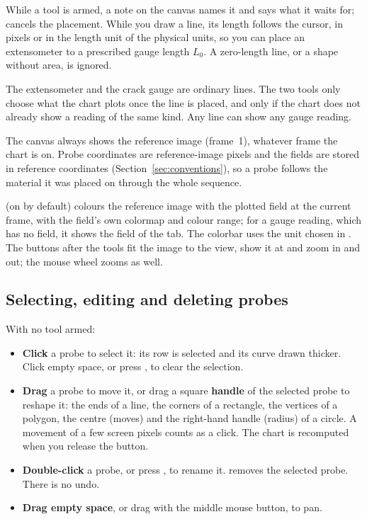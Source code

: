 While a tool is armed, a note on the canvas names it and says what it waits for;  cancels
the placement. While you draw a line, its length follows the cursor, in pixels or in the length
unit of the physical units, so you can place an extensometer to a prescribed gauge length $L_0$. A
zero-length line, or a shape without area, is ignored.

The extensometer and the crack gauge are ordinary lines. The two tools only choose what the chart
plots once the line is placed, and only if the chart does not already show a reading of the same
kind. Any line can show any gauge reading.

\begin{notebox}
The canvas always shows the reference image (frame~1), whatever frame the chart is on. Probe
coordinates are reference-image pixels and the fields are stored in reference coordinates
(Section~\ref{sec:conventions}), so a probe follows the material it was placed on through the whole
sequence.
\end{notebox}

 (on by default) colours the reference image with the plotted field at the current
frame, with the field's own colormap and colour range; for a gauge reading, which has no field, it
shows the field of the  tab. The colorbar uses the unit chosen in
. The buttons after the tools fit the image to the view, show it at  and
zoom in and out; the mouse wheel zooms as well.

\subsection{Selecting, editing and deleting probes}

With no tool armed:

\begin{itemize}
  \item \textbf{Click} a probe to select it: its row is selected and its curve drawn thicker.
    Click empty space, or press , to clear the selection.
  \item \textbf{Drag} a probe to move it, or drag a square \textbf{handle} of the selected probe to
    reshape it: the ends of a line, the corners of a rectangle, the vertices of a polygon, the
    centre (moves) and the right-hand handle (radius) of a circle. A movement of a few screen
    pixels counts as a click. The chart is recomputed when you release the button.
  \item \textbf{Double-click} a probe, or press , to rename it.  removes the
    selected probe. There is no undo.
  \item \textbf{Drag empty space}, or drag with the middle mouse button, to pan.
\end{itemize}

